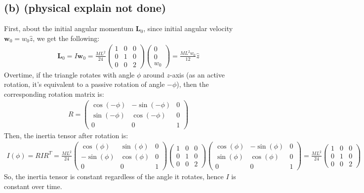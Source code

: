\documentclass{article}
\begin{document}
\subsection*{(b) (physical explain not done)}
First, about the initial angular momentum $\textbf{L}_0$, since initial angular velocity $\textbf{w}_0 = w_0\hat{z}$, we get the following:
\begin{align}
    \textbf{L}_0 = I\textbf{w}_0 = \frac{ML^2}{24}\begin{pmatrix}
        1&0&0\\0&1&0\\0&0&2
    \end{pmatrix} \begin{pmatrix}
        0\\0\\w_0
    \end{pmatrix} = \frac{ML^2w_0}{12}\hat{z}
\end{align}
Overtime, if the triangle rotates with angle $\phi$ around $z$-axis (as an active rotation, it's equivalent to a passive rotation of angle $-\phi$), then the corresponding rotation matrix is:
\begin{align}
    R = \begin{pmatrix}
        \cos(-\phi) & -\sin(-\phi)&0\\
        \sin(-\phi) & \cos(-\phi)& 0\\
        0&0&1
    \end{pmatrix}
\end{align}
Then, the inertia tensor after rotation is:
\begin{align}
    I(\phi) = RIR^T = \frac{ML^2}{24}\begin{pmatrix}
        \cos(\phi) & \sin(\phi)&0\\
        -\sin(\phi) & \cos(\phi)& 0\\
        0&0&1
    \end{pmatrix}\begin{pmatrix}
        1&0&0\\0&1&0\\0&0&2
    \end{pmatrix}\begin{pmatrix}
        \cos(\phi) & -\sin(\phi)&0\\
        \sin(\phi) & \cos(\phi)& 0\\
        0&0&1
    \end{pmatrix}= \frac{ML^2}{24}\begin{pmatrix}
        1&0&0\\0&1&0\\0&0&2
    \end{pmatrix}
\end{align}
So, the inertia tensor is constant regardless of the angle it rotates, hence $I$ is constant over time.
\end{document}
